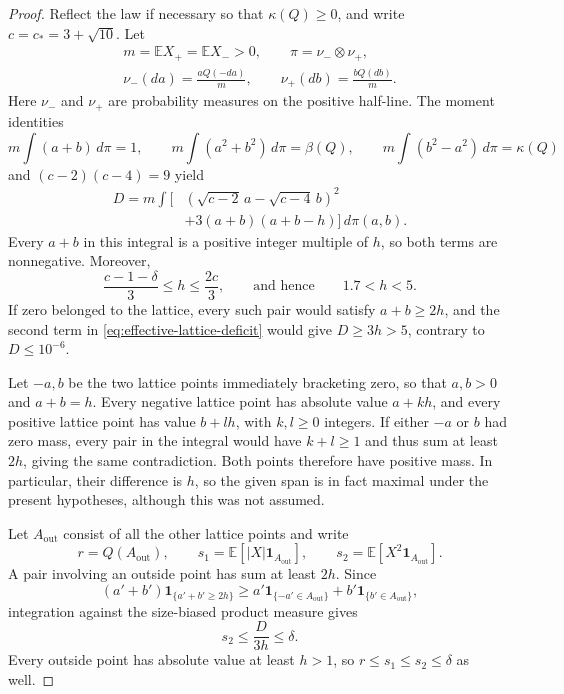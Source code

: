 \documentclass[aop]{imsart}
\theoremstyle{plain}
\theoremstyle{definition}
\theoremstyle{definition}
\newcommand{\EE}{\mathbb E}
\newcommand{\ind}{\mathbf 1}
\begin{document}
\begin{proof}
Reflect the law if necessary so that $\kappa(Q)\ge0$, and write
$c=c_*=3+\sqrt{10}$.  Let
\[
\begin{gathered}
 m=\EE X_+=\EE X_->0,\qquad \pi=\nu_-\otimes\nu_+,\\
 \nu_-(da)=\frac{aQ(-da)}m,\qquad
 \nu_+(db)=\frac{bQ(db)}m.
\end{gathered}
\]
Here $\nu_-$ and $\nu_+$ are probability measures on the positive
half-line.  The
moment identities
\[
 m\int(a+b)\,d\pi=1,\qquad
 m\int(a^2+b^2)\,d\pi=\beta(Q),\qquad
 m\int(b^2-a^2)\,d\pi=\kappa(Q)
\]
and $(c-2)(c-4)=9$ yield
\begin{equation}\label{eq:effective-lattice-deficit}
\begin{split}
 D=m\int\bigl[
 &(\sqrt{c-2}\,a-\sqrt{c-4}\,b)^2\\
 &+3(a+b)(a+b-h)\bigr]\,d\pi(a,b).
\end{split}
\end{equation}
Every $a+b$ in this integral is a positive integer multiple of
$h$, so both terms are nonnegative.  Moreover,
\[
 \frac{c-1-\delta}{3}\le h\le\frac{2c}{3},
 \qquad\text{and hence}\qquad 1.7<h<5.
\]
If zero belonged to the lattice, every such pair would satisfy
$a+b\ge2h$, and the second term in
\eqref{eq:effective-lattice-deficit} would give $D\ge3h>5$,
contrary to $D\le10^{-6}$.

Let $-a,b$ be the two lattice points immediately bracketing zero,
so that $a,b>0$ and $a+b=h$.  Every negative lattice point has
absolute value $a+kh$, and every positive lattice point has value
$b+lh$, with $k,l\ge0$ integers.  If either $-a$ or $b$ had zero
mass, every pair in the integral would have $k+l\ge1$ and thus
sum at least $2h$, giving the same contradiction.  Both points
therefore have positive mass.  In particular, their difference is
$h$, so the given span is in fact maximal under the present
hypotheses, although this was not assumed.

Let $A_{\mathrm{out}}$ consist of all the other lattice points and
write
\[
 r=Q(A_{\mathrm{out}}),\qquad
 s_1=\EE[|X|\ind_{A_{\mathrm{out}}}],\qquad
 s_2=\EE[X^2\ind_{A_{\mathrm{out}}}].
\]
A pair involving an outside point has sum at least $2h$.  Since
\[
 (a'+b')\ind_{\{a'+b'\ge2h\}}
 \ge a'\ind_{\{-a'\in A_{\mathrm{out}}\}}
     +b'\ind_{\{b'\in A_{\mathrm{out}}\}},
\]
integration against the size-biased product measure gives
\begin{equation}\label{eq:effective-extra-lattice-mass}
 s_2\le\frac{D}{3h}\le\delta.
\end{equation}
Every outside point has absolute value at least $h>1$, so
$r\le s_1\le s_2\le\delta$ as well.


\end{proof}
\end{document}
